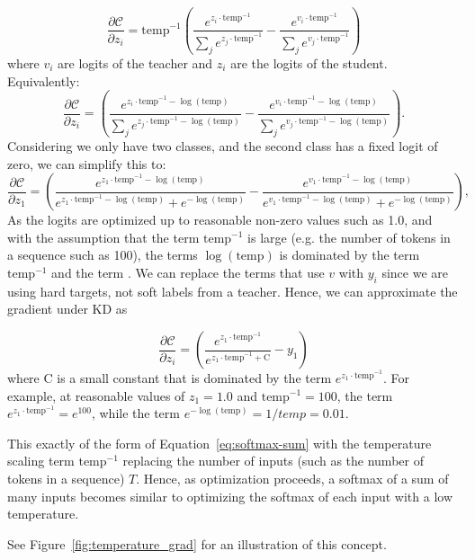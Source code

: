 \documentclass[twoside,11pt]{article}
\begin{document}
\[
\frac{\partial \mathcal{C}}{\partial z_i} = \mathrm{temp}^{-1} \left( 
\frac{e^{z_i \cdot \mathrm{temp}^{-1}}}{\sum_j e^{z_j \cdot \mathrm{temp}^{-1}}} 
- 
\frac{e^{v_i \cdot \mathrm{temp}^{-1}}}{\sum_j e^{v_j \cdot \mathrm{temp}^{-1}}} 
\right)
\] 
where $v_i$ are logits of the teacher and
$z_i$ are the logits of the student. Equivalently:
\[
\frac{\partial \mathcal{C}}{\partial z_i} = \left( 
\frac{e^{z_i \cdot \mathrm{temp}^{-1} - \log(\mathrm{temp})}}{\sum_j e^{z_j \cdot \mathrm{temp}^{-1} - \log(\mathrm{temp})}} 
- 
\frac{e^{v_i \cdot \mathrm{temp}^{-1} - \log(\mathrm{temp})}}{\sum_j e^{v_j \cdot \mathrm{temp}^{-1} - \log(\mathrm{temp})}} 
\right).
\]
Considering we only have two classes, and the second class has a fixed
logit of zero, we can simplify this to:
\[
\frac{\partial \mathcal{C}}{\partial z_1} 
= 
\left( 
\frac{e^{z_1 \cdot \mathrm{temp}^{-1} - \log(\mathrm{temp})}}{e^{z_1 \cdot \mathrm{temp}^{-1} - \log(\mathrm{temp})} + e^{-\log(\mathrm{temp})}} 
- 
\frac{e^{v_1 \cdot \mathrm{temp}^{-1} - \log(\mathrm{temp})}}{e^{v_1 \cdot \mathrm{temp}^{-1} - \log(\mathrm{temp})} + e^{-\log(\mathrm{temp})}} 
\right),
\]
As the logits are optimized up to reasonable non-zero values such as 1.0, 
and with
the assumption that the term $\mathrm{temp}^{-1}$ is large (e.g. the 
number of tokens in a sequence such as 100), 
the terms $\log(\mathrm{temp})$ is dominated
by the term $\mathrm{temp}^{-1}$ and the term . We can replace the terms that use $v$
with $y_i$ since we are using hard targets, not soft labels from a teacher. 
Hence, we can approximate the gradient under KD as

\begin{equation}
\frac{\partial \mathcal{C}}{\partial z_i} = \left( 
  \frac{e^{z_1 \cdot \mathrm{temp}^{-1} }}{e^{z_1 \cdot \mathrm{temp}^{-1} + \mathrm{C}}} 
  - 
y_1
\right)
\end{equation}
where $\mathrm{C}$ is a small constant that is dominated by the term 
$e^{z_1 \cdot \mathrm{temp}^{-1}}$. 
For example, at reasonable values of 
$z_1 = 1.0$ and $\mathrm{temp}^{-1} = 100$, the term 
$e^{z_1 \cdot \mathrm{temp}^{-1}} = e^{100}$, while the term
$e^{-\log(\mathrm{temp})} = 1 / temp = 0.01$. 

This exactly of the form of Equation~\ref{eq:softmax-sum} with the 
temperature scaling term $\mathrm{temp}^{-1}$ replacing the number of inputs 
(such as the number of tokens in a sequence) $T$.
Hence, as optimization proceeds, a softmax of a sum of
many inputs becomes similar to optimizing the softmax of each input with
a low temperature. 

See Figure~\ref{fig:temperature_grad} for an illustration of this concept.




\vskip 0.2in

\end{document}

